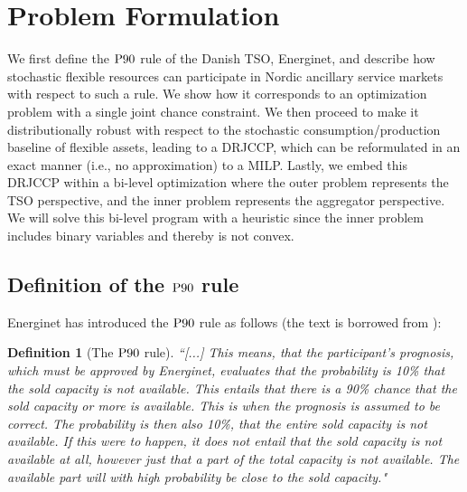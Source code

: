 \documentclass[conference]{IEEEtran}
\newtheorem{definition}{Definition} %
\begin{document}
\vspace{2mm}
\section{Problem Formulation}\label{sec:problem-formulation}
\vspace{-1mm}
We first define the $\rm{P90}$ rule of the Danish TSO, Energinet, and describe how stochastic flexible resources can participate in Nordic ancillary service markets with respect to such a rule. We show how it corresponds to an optimization problem with a single joint chance constraint. We then proceed to make it distributionally robust with respect to the stochastic consumption/production baseline of  flexible assets, leading to a  \ac{DRJCCP}, which can be  reformulated in an exact manner (i.e., no approximation) to a \ac{MILP}. Lastly, we embed this \ac{DRJCCP} within a bi-level optimization where the outer problem represents the \ac{TSO} perspective, and the inner problem represents the aggregator perspective. We will solve this bi-level program with a heuristic since the inner problem includes binary variables and thereby is not convex. 

\vspace{2mm}
\subsection{Definition of the $\rm{P90}$ rule}
\vspace{-1mm}
Energinet has introduced the $\rm{P90}$ rule as follows (the text is borrowed from \cite{energinet}): 
%
%
\begin{definition}[The $\rm{P90}$ rule]\label{def:P90}
    \textit{``[...] This means, that the participant's prognosis, which must be approved by Energinet, evaluates that the probability is 10\% that the sold capacity is not available. This entails that there is a 90\% chance that the sold capacity or more is available. This is when the prognosis is assumed to be correct.
    The probability is then also 10\%, that the entire sold capacity is not available. If this were to happen, it does not entail that the sold capacity is not available at all, however just that a part of the total capacity is not available. The available part will with high probability be close to the sold capacity."}
\end{definition}
\end{document}
